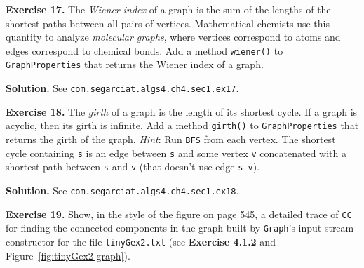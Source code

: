 \documentclass[12pt, a4paper]{article}
\newenvironment{ex}[2][Exercise]
{\par\medskip\noindent \textbf{#1 #2.}}
{\medskip}
\newenvironment{sol}[1][Solution]
{\par\medskip\noindent \textbf{#1.} }
{\medskip}
\begin{document}
	\begin{ex}{17}
		The \emph{Wiener index} of a graph is the sum of the lengths of the shortest
		paths between all pairs of vertices. Mathematical chemists use this
		quantity to analyze \emph{molecular graphs}, where vertices correspond to
		atoms and edges correspond to chemical bonds. Add a method \texttt{wiener()}
		to \texttt{GraphProperties} that returns the Wiener index of a graph.
	\end{ex}
	\begin{sol}
		See \texttt{com.segarciat.algs4.ch4.sec1.ex17}.
	\end{sol}
	\begin{ex}{18}
		The \emph{girth} of a graph is the length of its shortest cycle. If a graph is
		acyclic, then its girth is infinite. Add a method \texttt{girth()} to
		\texttt{GraphProperties} that returns the girth of the graph. \emph{Hint}: Run
		\texttt{BFS} from each vertex. The shortest cycle containing \texttt{s} is an
		edge between \texttt{s} and some vertex \texttt{v} concatenated with a shortest
		path between \texttt{s} and \texttt{v} (that doesn't use edge \texttt{s-v}).
	\end{ex}
	\begin{sol}
		See \texttt{com.segarciat.algs4.ch4.sec1.ex18}.
	\end{sol}
	\begin{ex}{19}
		Show, in the style of the figure on page 545, a detailed trace of \texttt{CC}
		for finding the connected components in the graph built by \texttt{Graph}'s
		input stream constructor for the file \texttt{tinyGex2.txt} (see \textbf{Exercise 4.1.2}
		and Figure~\ref{fig:tinyGex2-graph}).
	\end{ex}
\end{document}
